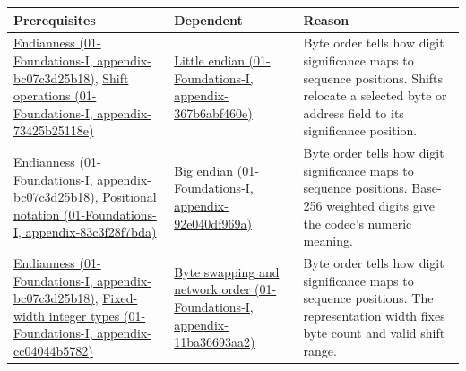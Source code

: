 {\def\LTcaptype{none} %
\begin{longtable}[]{@{}
  >{\raggedright\arraybackslash}p{}
  >{\raggedright\arraybackslash}p{}
  >{\raggedright\arraybackslash}p{}@{}}
\toprule\noalign{}
\begin{minipage}[b]{\linewidth}\raggedright
Prerequisites
\end{minipage} & \begin{minipage}[b]{\linewidth}\raggedright
Dependent
\end{minipage} & \begin{minipage}[b]{\linewidth}\raggedright
Reason
\end{minipage} \\
\midrule\noalign{}
\endhead
\bottomrule\noalign{}
\endlastfoot
\href{../01-Foundations-I/main.pdf\#nameddest=appendix-bc07c3d25b18}{Endianness (01-Foundations-I, appendix-bc07c3d25b18)}, \href{../01-Foundations-I/main.pdf\#nameddest=appendix-73425b25118e}{Shift operations (01-Foundations-I, appendix-73425b25118e)} & \href{../01-Foundations-I/main.pdf\#nameddest=appendix-367b6abf460e}{Little endian (01-Foundations-I, appendix-367b6abf460e)} & Byte order tells how digit significance maps to sequence positions. Shifts relocate a selected byte or address field to its significance position. \\
\href{../01-Foundations-I/main.pdf\#nameddest=appendix-bc07c3d25b18}{Endianness (01-Foundations-I, appendix-bc07c3d25b18)}, \href{../01-Foundations-I/main.pdf\#nameddest=appendix-83c3f28f7bda}{Positional notation (01-Foundations-I, appendix-83c3f28f7bda)} & \href{../01-Foundations-I/main.pdf\#nameddest=appendix-92e040df969a}{Big endian (01-Foundations-I, appendix-92e040df969a)} & Byte order tells how digit significance maps to sequence positions. Base-256 weighted digits give the codec's numeric meaning. \\
\href{../01-Foundations-I/main.pdf\#nameddest=appendix-bc07c3d25b18}{Endianness (01-Foundations-I, appendix-bc07c3d25b18)}, \href{../01-Foundations-I/main.pdf\#nameddest=appendix-cc04044b5782}{Fixed-width integer types (01-Foundations-I, appendix-cc04044b5782)} & \href{../01-Foundations-I/main.pdf\#nameddest=appendix-11ba36693aa2}{Byte swapping and network order (01-Foundations-I, appendix-11ba36693aa2)} & Byte order tells how digit significance maps to sequence positions. The representation width fixes byte count and valid shift range. \\

\end{longtable}}
